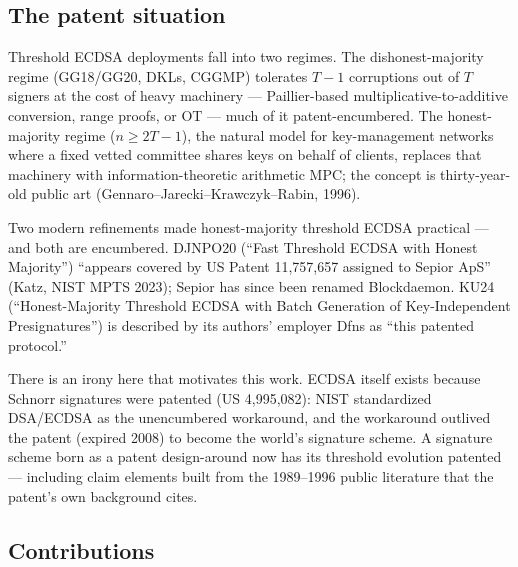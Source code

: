 \documentclass[11pt]{article}
\theoremstyle{plain}
\theoremstyle{definition}
\theoremstyle{remark}
\begin{document}
\subsection{The patent situation}

Threshold ECDSA deployments fall into two regimes. The dishonest-majority regime (GG18/GG20, DKLs, CGGMP) tolerates $T{-}1$ corruptions out of $T$ signers at the cost of heavy machinery --- Paillier-based multiplicative-to-additive conversion, range proofs, or OT --- much of it patent-encumbered. The honest-majority regime ($n \geq 2T{-}1$), the natural model for key-management networks where a fixed vetted committee shares keys on behalf of clients, replaces that machinery with information-theoretic arithmetic MPC; the concept is thirty-year-old public art (Gennaro--Jarecki--Krawczyk--Rabin, 1996).

Two modern refinements made honest-majority threshold ECDSA practical --- and both are encumbered. DJNPO20 (``Fast Threshold ECDSA with Honest Majority'') ``appears covered by US Patent 11,757,657 assigned to Sepior ApS'' (Katz, NIST MPTS 2023); Sepior has since been renamed Blockdaemon. KU24 (``Honest-Majority Threshold ECDSA with Batch Generation of Key-Independent Presignatures'') is described by its authors' employer Dfns as ``this patented protocol.''

There is an irony here that motivates this work. ECDSA itself exists because Schnorr signatures were patented (US 4,995,082): NIST standardized DSA/ECDSA as the unencumbered workaround, and the workaround outlived the patent (expired 2008) to become the world's signature scheme. A signature scheme born as a patent design-around now has its threshold evolution patented --- including claim elements built from the 1989--1996 public literature that the patent's own background cites.

\subsection{Contributions}
\end{document}
